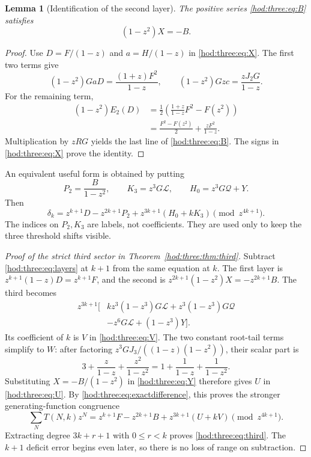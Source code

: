 \documentclass[11pt,letterpaper]{article}
\newtheorem{lemma}[theorem]{Lemma}
\theoremstyle{definition}\newtheorem{definition}[theorem]{Definition}
\theoremstyle{remark}\newtheorem{remark}[theorem]{Remark}
\newcommand{\Lcal}{\mathcal L}
\newcommand{\Qcal}{\mathcal Q}
\begin{document}
\begin{lemma}[Identification of the second layer]\label{hod:three:lem:X}
The positive series \eqref{hod:three:eq:B} satisfies
\begin{equation}\label{hod:three:eq:XB}
(1-z^2)X=-B.
\end{equation}
\end{lemma}
\begin{proof}
Use $D=F/(1-z)$ and $a=H/(1-z)$ in \eqref{hod:three:eq:X}. The first two terms give
\[
(1-z^2)GaD=\frac{(1+z)F^2}{1-z},\qquad
(1-z^2)Gzc=\frac{zJ_2G}{1-z}.
\]
For the remaining term,
\begin{align*}
(1-z^2)E_2(D)
&=\frac12\left(\frac{1+z}{1-z}F^2-F(z^2)\right)\\
&=\frac{F^2-F(z^2)}2+\frac{zF^2}{1-z}.
\end{align*}
Multiplication by $zRG$ yields the last line of \eqref{hod:three:eq:B}. The signs in \eqref{hod:three:eq:X} prove the identity.
\end{proof}

An equivalent useful form is obtained by putting
\begin{equation}\label{hod:three:eq:PKH}
P_2=\frac B{1-z^2},\qquad K_3=z^3G\Lcal,\qquad H_0=z^3G\Qcal+Y.
\end{equation}
Then
\begin{equation}\label{hod:three:eq:compactdelta}
\delta_k=z^{k+1}D-z^{2k+1}P_2+z^{3k+1}(H_0+kK_3)
\pmod {z^{4k+1}}.
\end{equation}
The indices on $P_2,K_3$ are labels, not coefficients. They are used only to keep the three threshold shifts visible.

\begin{proof}[Proof of the strict third sector in Theorem~\ref{hod:three:thm:third}]
Subtract \eqref{hod:three:eq:layers} at $k+1$ from the same equation at $k$. The first layer is
$z^{k+1}(1-z)D=z^{k+1}F$, and the second is
$z^{2k+1}(1-z^2)X=-z^{2k+1}B$. The third becomes
\begin{equation}\label{hod:three:eq:thirddifference}
\begin{split}
z^{3k+1}\big[&kz^3(1-z^3)G\Lcal+z^3(1-z^3)G\Qcal\\
&-z^6G\Lcal+(1-z^3)Y\big].
\end{split}
\end{equation}
Its coefficient of $k$ is $V$ in \eqref{hod:three:eq:V}. The two constant root-tail terms simplify to $W$: after factoring $z^3GJ_3/((1-z)(1-z^2))$, their scalar part is
\[
3+\frac z{1-z}+\frac{z^2}{1-z^2}
=1+\frac1{1-z}+\frac1{1-z^2}.
\]
Substituting $X=-B/(1-z^2)$ in \eqref{hod:three:eq:Y} therefore gives $U$ in \eqref{hod:three:eq:U}. By \eqref{hod:three:eq:exactdifference}, this proves the stronger generating-function congruence
\begin{equation}\label{hod:three:eq:maxcongruence}
\sum_N T(N,k)z^N=z^{k+1}F-z^{2k+1}B+z^{3k+1}(U+kV)
\pmod {z^{4k+1}}.
\end{equation}
Extracting degree $3k+r+1$ with $0\le r<k$ proves \eqref{hod:three:eq:third}. The $k+1$ deficit error begins even later, so there is no loss of range on subtraction.
\end{proof}
\end{document}
